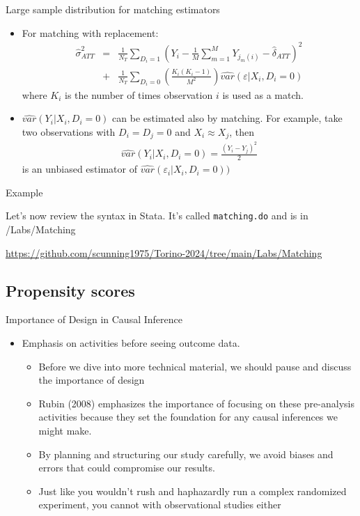 \documentclass{beamer}
\begin{document}
\begin{frame}{Large sample distribution for matching estimators}
	
	\begin{itemize}
	\item For matching with replacement:
		\begin{eqnarray*}
		\widehat{\sigma}^2_{ATT} &=& \frac{1}{N_T} \sum_{D_i=1} \left( Y_i - \frac{1}{M} \sum_{m=1}^M Y_{j_m(i)} - \widehat{\delta}_{ATT} \right)^2 \\
		&+& \frac{1}{N_T} \sum_{D_i=0} \left( \frac{K_i(K_i-1)}{M^2} \right) \widehat{var}(\varepsilon | X_i,D_i=0)
		\end{eqnarray*}where $K_i$ is the number of times observation $i$ is used as a match.
	\item $\widehat{var}(Y_i | X_i,D_i=0)$ can be estimated also by matching.  For example, take two observations with $D_i=D_j=0$ and $X_i \approx X_j$, then
		\begin{eqnarray*}
		\widehat{var}(Y_i | X_i,D_i=0) = \frac{(Y_i-Y_j)^2}{2}
		\end{eqnarray*}is an unbiased estimator of $\widehat{var}(\varepsilon_i | X_i,D_i=0))$
	\end{itemize}
\end{frame}

\begin{frame}{Example}

Let's now review the syntax in Stata.  It's called \texttt{matching.do} and is in /Labs/Matching 

\bigskip

\url{https://github.com/scunning1975/Torino-2024/tree/main/Labs/Matching}

\end{frame}


\subsection{Propensity scores}

\begin{frame}{Importance of Design in Causal Inference}
  \begin{itemize}
    \item Emphasis on activities before seeing outcome data.
    	\begin{itemize}
	\item Before we dive into more technical material, we should pause and discuss the importance of design
	\item Rubin (2008) emphasizes the importance of focusing on these pre-analysis activities because they set the foundation for any causal inferences we might make. 
	\item By planning and structuring our study carefully, we avoid biases and errors that could compromise our results.
	\item Just like you wouldn't rush and haphazardly run a complex randomized experiment, you cannot with observational studies either
	\end{itemize}
  \end{itemize}
\end{frame}
\end{document}
